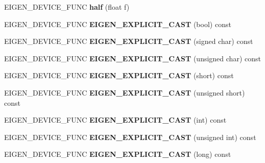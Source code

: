 \begin{DoxyCompactItemize}
E\+I\+G\+E\+N\+\_\+\+D\+E\+V\+I\+C\+E\+\_\+\+F\+U\+NC {\bfseries half} (float f)
\item 
\mbox{\label{struct_eigen_1_1half_aeef3ed6d55a3eb70d1434f8576d3cfea}} 
E\+I\+G\+E\+N\+\_\+\+D\+E\+V\+I\+C\+E\+\_\+\+F\+U\+NC {\bfseries E\+I\+G\+E\+N\+\_\+\+E\+X\+P\+L\+I\+C\+I\+T\+\_\+\+C\+A\+ST} (bool) const
\item 
\mbox{\label{struct_eigen_1_1half_aa957f6c648dc3188adee73cf50682786}} 
E\+I\+G\+E\+N\+\_\+\+D\+E\+V\+I\+C\+E\+\_\+\+F\+U\+NC {\bfseries E\+I\+G\+E\+N\+\_\+\+E\+X\+P\+L\+I\+C\+I\+T\+\_\+\+C\+A\+ST} (signed char) const
\item 
\mbox{\label{struct_eigen_1_1half_ae56d5d68c54e0d8b7beab386ef2e8a0d}} 
E\+I\+G\+E\+N\+\_\+\+D\+E\+V\+I\+C\+E\+\_\+\+F\+U\+NC {\bfseries E\+I\+G\+E\+N\+\_\+\+E\+X\+P\+L\+I\+C\+I\+T\+\_\+\+C\+A\+ST} (unsigned char) const
\item 
\mbox{\label{struct_eigen_1_1half_a76abee321fb7d020343b7660dd03d138}} 
E\+I\+G\+E\+N\+\_\+\+D\+E\+V\+I\+C\+E\+\_\+\+F\+U\+NC {\bfseries E\+I\+G\+E\+N\+\_\+\+E\+X\+P\+L\+I\+C\+I\+T\+\_\+\+C\+A\+ST} (short) const
\item 
\mbox{\label{struct_eigen_1_1half_af3b8a6e7e62900a1be10c3f95d7d41d7}} 
E\+I\+G\+E\+N\+\_\+\+D\+E\+V\+I\+C\+E\+\_\+\+F\+U\+NC {\bfseries E\+I\+G\+E\+N\+\_\+\+E\+X\+P\+L\+I\+C\+I\+T\+\_\+\+C\+A\+ST} (unsigned short) const
\item 
\mbox{\label{struct_eigen_1_1half_a3f5643f9d3767ac0286a417a56160f49}} 
E\+I\+G\+E\+N\+\_\+\+D\+E\+V\+I\+C\+E\+\_\+\+F\+U\+NC {\bfseries E\+I\+G\+E\+N\+\_\+\+E\+X\+P\+L\+I\+C\+I\+T\+\_\+\+C\+A\+ST} (int) const
\item 
\mbox{\label{struct_eigen_1_1half_a90ab8f1d652236107341dd1cf8c95b11}} 
E\+I\+G\+E\+N\+\_\+\+D\+E\+V\+I\+C\+E\+\_\+\+F\+U\+NC {\bfseries E\+I\+G\+E\+N\+\_\+\+E\+X\+P\+L\+I\+C\+I\+T\+\_\+\+C\+A\+ST} (unsigned int) const
\item 
\mbox{\label{struct_eigen_1_1half_a3bfe6d8bbcd81e1107acd06885114238}} 
E\+I\+G\+E\+N\+\_\+\+D\+E\+V\+I\+C\+E\+\_\+\+F\+U\+NC {\bfseries E\+I\+G\+E\+N\+\_\+\+E\+X\+P\+L\+I\+C\+I\+T\+\_\+\+C\+A\+ST} (long) const

\end{DoxyCompactItemize}
